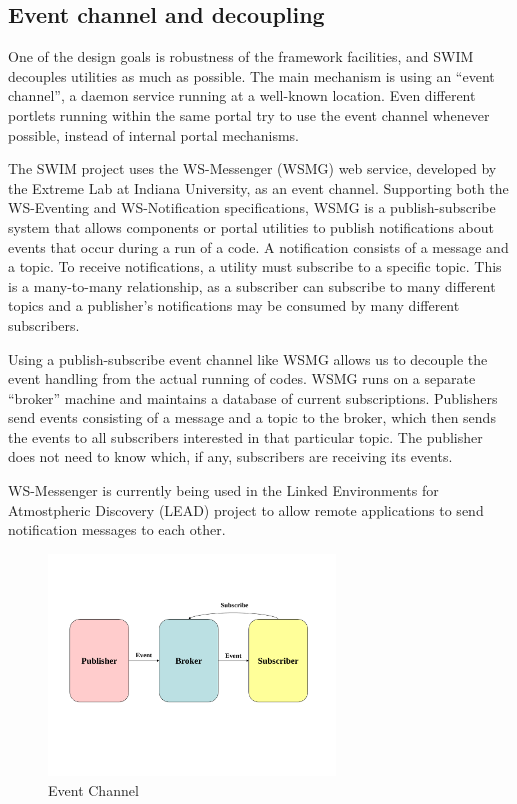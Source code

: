\subsection{Event channel and decoupling}
\label{sec:eventchannel}
One of the design goals is robustness of the framework facilities,
and SWIM decouples utilities as much as possible. The main mechanism is using
an ``event channel'', a daemon service running at a well-known location.
Even different portlets running within the same portal try to use the event
channel whenever possible, instead of internal portal mechanisms.

The SWIM project uses the WS-Messenger (WSMG) \cite{wsmg,wsmgpaper} web service,
developed by the Extreme Lab at Indiana University, as an
event channel. Supporting both 
the WS-Eventing and WS-Notification specifications, WSMG is a
publish-subscribe system that allows
components or portal utilities to publish notifications
about events that occur during a run of a code.  A notification
consists of a message and a topic.  To receive notifications, a
utility must subscribe to a specific topic.  This is a
many-to-many relationship, as a subscriber can subscribe to many
different topics and a publisher's notifications may be consumed
by many different subscribers.

Using a publish-subscribe event channel like WSMG allows us to
decouple the event handling from the actual running of codes.
WSMG runs on a separate ``broker'' machine and maintains a
database of current subscriptions.  Publishers send events
consisting of a message and a topic to the broker, which then
sends the events to all subscribers interested in that particular
topic.  The publisher does not need to know which, if any,
subscribers are receiving its events.

WS-Messenger is currently being used in the Linked Environments
for Atmostpheric Discovery (LEAD)\cite{lead} project to allow remote
applications to send notification messages to each other.

\begin{figure}
\centering
\includegraphics[width=3.0in]{eventpic}
\caption{Event Channel}
\label{eventchannelpic}
\end{figure}

